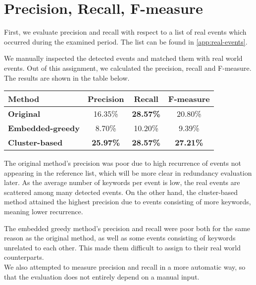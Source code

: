 \section{Precision, Recall, F-measure}

First, we evaluate precision and recall with respect to a list of real events which occurred during the examined period. The list can be found in \autoref{app:real-events}.

We manually inspected the detected events and matched them with real world events. Out of this assignment, we calculated the precision, recall and F-measure. The results are shown in the table below.

\hspace{\fill}

\begin{minipage}{\linewidth}
\centering
\begin{tabular}{ l c c c }\toprule[1.5pt]
\bf Method 	 & \bf Precision & \bf Recall & \bf F-measure \\ \midrule
\bf Original &  16.35\%     & \bf 28.57\%     &  20.80\% \\
\bf Embedded-greedy   &  8.70\%     & 10.20\%      &  9.39\% \\
\bf Cluster-based &  \bf 25.97\%     & \bf 28.57\%      & \bf 27.21\% \\ \bottomrule[1.25pt]
\end {tabular}\par
{} \label{tab:title}
\end{minipage}

\hspace{\fill}

The original method's precision was poor due to high recurrence of events not appearing in the reference list, which will be more clear in redundancy evaluation later. As the average number of keywords per event is low, the real events are scattered among many detected events. On the other hand, the cluster-based method attained the highest precision due to events consisting of more keywords, meaning lower recurrence.

The embedded greedy method's precision and recall were poor both for the same reason as the original method, as well as some events consisting of keywords unrelated to each other. This made them difficult to assign to their real world counterparts.\\

We also attempted to measure precision and recall in a more automatic way, so that the evaluation does not entirely depend on a manual input.

